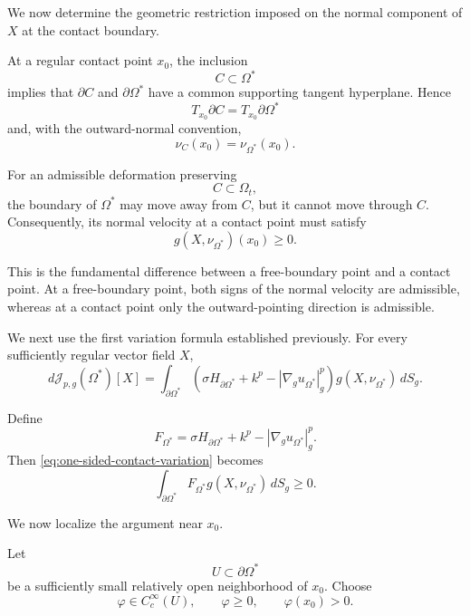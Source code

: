 \documentclass{article}
\begin{document}
We now determine the geometric restriction imposed on the normal
component of $X$ at the contact boundary.

At a regular contact point $x_0$, the inclusion
\[
C\subset\Omega^\ast
\]
implies that $\partial C$ and $\partial\Omega^\ast$ have a common
supporting tangent hyperplane. Hence
\[
T_{x_0}\partial C
=
T_{x_0}\partial\Omega^\ast
\]
and, with the outward-normal convention,
\[
\nu_C(x_0)
=
\nu_{\Omega^\ast}(x_0).
\]

For an admissible deformation preserving
\[
C\subset\Omega_t,
\]
the boundary of $\Omega^\ast$ may move away from $C$, but it cannot
move through $C$. Consequently, its normal velocity at a contact point
must satisfy
\begin{equation}
g(X,\nu_{\Omega^\ast})(x_0)\geq0.
\label{eq:contact-normal-velocity}
\end{equation}

This is the fundamental difference between a free-boundary point and a
contact point. At a free-boundary point, both signs of the normal
velocity are admissible, whereas at a contact point only the
outward-pointing direction is admissible.

We next use the first variation formula established previously. For
every sufficiently regular vector field $X$,
\[
d\mathcal J_{p,g}(\Omega^\ast)[X]
=
\int_{\partial\Omega^\ast}
\left(
\sigma H_{\partial\Omega^\ast}
+k^p
-
|\nabla_g u_{\Omega^\ast}|_g^p
\right)
g(X,\nu_{\Omega^\ast})\,dS_g.
\]

Define
\[
F_{\Omega^\ast}
=
\sigma H_{\partial\Omega^\ast}
+k^p
-
|\nabla_g u_{\Omega^\ast}|_g^p.
\]
Then \eqref{eq:one-sided-contact-variation} becomes
\begin{equation}
\int_{\partial\Omega^\ast}
F_{\Omega^\ast}
g(X,\nu_{\Omega^\ast})\,dS_g
\geq0.
\label{eq:global-contact-variation}
\end{equation}

We now localize the argument near $x_0$.

Let
\[
U\subset\partial\Omega^\ast
\]
be a sufficiently small relatively open neighborhood of $x_0$. Choose
\[
\varphi\in C_c^\infty(U),
\qquad
\varphi\geq0,
\qquad
\varphi(x_0)>0.
\]
\end{document}
